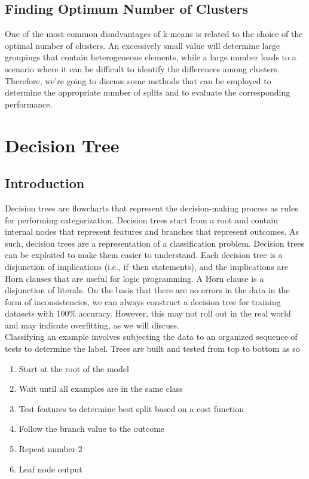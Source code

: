\documentclass[12pt]{article}
\begin{document}
\subsection{Finding Optimum Number of Clusters}
One of the most common disadvantages of k-means is related to the choice of the optimal
number of clusters. An excessively small value will determine large groupings that contain
heterogeneous elements, while a large number leads to a scenario where it can be difficult
to identify the differences among clusters. Therefore, we're going to discuss some methods
that can be employed to determine the appropriate number of splits and to evaluate the
corresponding performance.

\newpage
\section{Decision Tree}
\subsection{Introduction}
Decision trees are flowcharts that represent the decision-making process
as rules for performing categorization. Decision trees start from a root and
contain internal nodes that represent features and branches that represent
outcomes. As such, decision trees are a representation of a classification
problem. Decision trees can be exploited to make them easier to
understand. Each decision tree is a disjunction of implications (i.e., if–then
statements), and the implications are Horn clauses that are useful for logic
programming. A Horn clause is a disjunction of literals.
On the basis that there are no errors in the data in the form of
inconsistencies, we can always construct a decision tree for training
datasets with 100\% accuracy. However, this may not roll out in the real
world and may indicate overfitting, as we will discuss.
\\
Classifying an example involves subjecting the data to an organized
sequence of tests to determine the label. Trees are built and tested from
top to bottom as so
\begin{enumerate}
\item Start at the root of the model
\item Wait until all examples are in the same class
\item Test features to determine best split based on a cost function
\item Follow the branch value to the outcome
\item Repeat number 2
\item Leaf node output
\end{enumerate}
\end{document}
